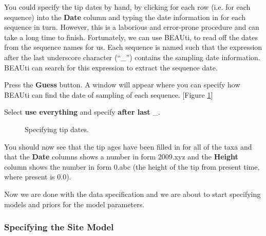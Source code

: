 \documentclass[11pt]{article}
\begin{document}
You could specify the tip dates by hand, by clicking for each row (i.e. for each sequence) into the \textbf{Date} column and typing the date information in for each sequence in turn. However, this is a laborious and error-prone procedure and can take a long time to finish. Fortunately, we can use BEAUti, to read off the dates from the sequence names for us. Each sequence is named such that the expression after the last underscore character (``\_'') contains the sampling date information. BEAUti can search for this expression to extract the sequence date.

\begin{framed}
Press the \textbf{Guess} button. A window will appear where you can specify how BEAUti can find the date of sampling of each sequence. [Figure \ref{guessDates}]

Select \textbf{use everything} and specify \textbf{after last} \_.
\end{framed}

\begin{figure}[h!]
\centering
{}
\caption{\small Specifying tip dates.}
\label{guessDates}
\end{figure}

You should now see that the tip ages have been filled in for all of the taxa and that the \textbf{Date} columns shows a number in form 2009.xyz and the \textbf{Height} column shows the number in form 0.abc (the height of the tip from present time, where present is 0.0).

Now we are done with the data specification and we are about to start specifying models and priors for the model parameters. 



\bigskip
\subsubsection{Specifying the Site Model}
\end{document}
